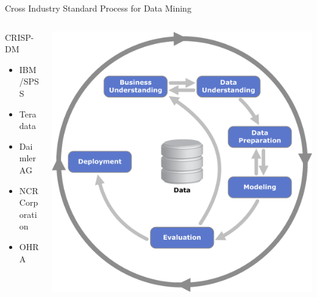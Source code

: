 \documentclass[10pt]{beamer}
\begin{document}
\begin{frame}{Cross Industry Standard Process for Data Mining}

\begin{columns}[C]
    \begin{column}{.5\textwidth}
    	CRISP-DM   	
    	\begin{itemize}
    		\item IBM/SPSS
    		\item Teradata 
   			\item Daimler AG 
    		\item NCR Corporation 
    		\item OHRA
		\end{itemize}
    \end{column}
    \begin{column}{.5\textwidth}
    \vspace{-0em}
	\begin{center}
   		\includegraphics[width=\textwidth]{images/crisp.png}
    \end{center}
    \end{column}
  \end{columns}

\end{frame}
\end{document}
